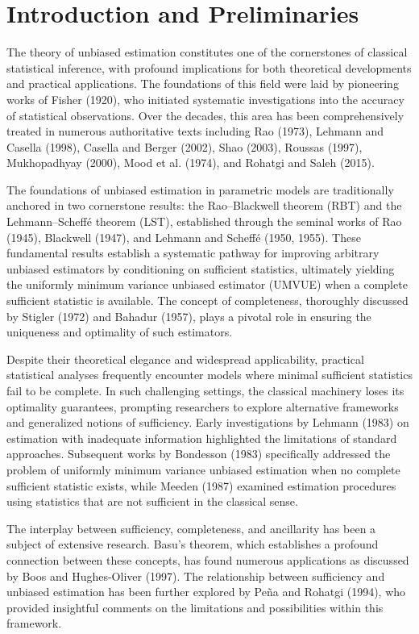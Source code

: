 \documentclass[twoside]{article}
\begin{document}
\section{Introduction and Preliminaries}\label{sec:intro}

The theory of unbiased estimation constitutes one of the cornerstones of classical statistical inference, with profound implications for both theoretical developments and practical applications. The foundations of this field were laid by pioneering works of Fisher (1920), who initiated systematic investigations into the accuracy of statistical observations. Over the decades, this area has been comprehensively treated in numerous authoritative texts including Rao (1973), Lehmann and Casella (1998), Casella and Berger (2002), Shao (2003), Roussas (1997), Mukhopadhyay (2000), Mood et al. (1974), and Rohatgi and Saleh (2015).

The foundations of unbiased estimation in parametric models are traditionally anchored in two cornerstone results: the Rao--Blackwell theorem (RBT) and the Lehmann--Scheff\'{e} theorem (LST), established through the seminal works of Rao (1945), Blackwell (1947), and Lehmann and Scheff\'{e} (1950, 1955). These fundamental results establish a systematic pathway for improving arbitrary unbiased estimators by conditioning on sufficient statistics, ultimately yielding the uniformly minimum variance unbiased estimator (UMVUE) when a complete sufficient statistic is available. The concept of completeness, thoroughly discussed by Stigler (1972) and Bahadur (1957), plays a pivotal role in ensuring the uniqueness and optimality of such estimators.

Despite their theoretical elegance and widespread applicability, practical statistical analyses frequently encounter models where minimal sufficient statistics fail to be complete. In such challenging settings, the classical machinery loses its optimality guarantees, prompting researchers to explore alternative frameworks and generalized notions of sufficiency. Early investigations by Lehmann (1983) on estimation with inadequate information highlighted the limitations of standard approaches. Subsequent works by Bondesson (1983) specifically addressed the problem of uniformly minimum variance unbiased estimation when no complete sufficient statistic exists, while Meeden (1987) examined estimation procedures using statistics that are not sufficient in the classical sense.

The interplay between sufficiency, completeness, and ancillarity has been a subject of extensive research. Basu's theorem, which establishes a profound connection between these concepts, has found numerous applications as discussed by Boos and Hughes-Oliver (1997). The relationship between sufficiency and unbiased estimation has been further explored by Pe\~{n}a and Rohatgi (1994), who provided insightful comments on the limitations and possibilities within this framework.
\end{document}
